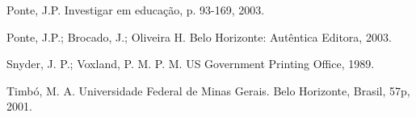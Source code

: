 \begin{multicols}{2}
\begin{thebibliography}{10}
    Ponte, J.P.
  \newblock Investigar em educação, p. 93-169, 2003.
  

    Ponte, J.P.; Brocado, J.; Oliveira H.
  \newblock Belo Horizonte: Autêntica Editora, 2003.


  Snyder, J. P.; Voxland, P. M.  
  \newblock P. M.  US Government Printing Office, 1989.
 

 Timbó, M. A.
  \newblock  Universidade Federal de Minas Gerais. Belo Horizonte, Brasil, 57p, 2001.




\end{thebibliography}
\end{multicols}
\endgroup
